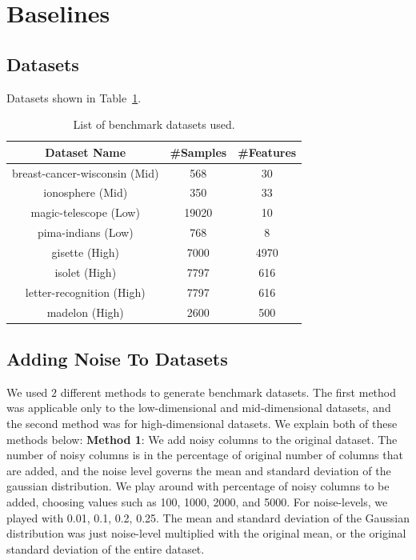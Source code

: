
\section{Baselines}
\subsection{Datasets}
Datasets shown in Table~\ref{table:datasets}.

\begin{table}[]
\centering
\label{table:datasets}
\begin{tabular}{ccc}
\textbf{Dataset Name}         & \textbf{\#Samples} & \textbf{\#Features} \\	\hline \hline
breast-cancer-wisconsin (Mid) & 568                & 30                  \\
ionosphere (Mid)              & 350                & 33                  \\
magic-telescope (Low)         & 19020              & 10                  \\
pima-indians (Low)            & 768                & 8		\\
gisette (High) & 7000 & 4970	\\
isolet (High) & 7797 & 616		\\
letter-recognition (High) & 7797 & 616	\\
madelon (High) & 2600 & 500	\\
\end{tabular}
\caption{List of benchmark datasets used.}
\end{table}

\subsection{Adding Noise To Datasets}
We used $2$ different methods to generate benchmark datasets. The first method was applicable only to the low-dimensional and mid-dimensional datasets, and the second method was for high-dimensional datasets. We explain both of these methods below:
\textbf{Method 1}: We add noisy columns to the original dataset. The number of noisy columns is in the percentage of original number of columns that are added, and the noise level governs the mean and standard deviation of the gaussian distribution. We play around with percentage of noisy columns to be added, choosing values such as  100, 1000, 2000, and 5000. For noise-levels, we played with 0.01, 0.1, 0.2, 0.25. The mean and standard deviation of the Gaussian distribution was just noise-level multiplied with the original mean, or the original standard deviation of the entire dataset.

